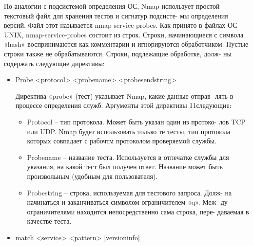 \documentclass[12pt,a4paper]{article}
\begin{document}
По аналогии с подсистемой определения ОС, Nmap использует
простой текстовый файл для хранения тестов и сигнатур подсисте-
мы определения версий. Файл этот называется nmap-service-probes.
Как принято в файлах ОС UNIX, nmap-service-probes состоит из
строк. Строки, начинающиеся с символа «hash» воспринимаются
как комментарии и игнорируются обработчиком. Пустые строки
также не обрабатываются. Строки, подлежащие обработке, долж-
ны содержать следующие директивы:
\begin{itemize}
\item Probe <protocol> <probename> <probesendstring>

Директива «probe» (тест) указывает Nmap, какие данные отправ-
лять в процессе определения служб. Аргументы этой директивы
11следующие:
\begin{itemize}
\item Protocol – тип протокола. Может быть указан один из протоко-
лов TCP или UDP. Nmap будет использовать только те тесты, тип
протокола которых совпадает с рабочтм протоколом проверяемой
службы.
\item Probename – название теста. Используется в отпечатке службы для
указания, на какой тест был получен ответ. Название может быть
произвольным (удобным для пользователя).
\item Probestring – строка, используемая для тестового запроса. Долж-
на начинаться и заканчиваться символом-ограничителем «q». Меж-
ду ограничителями находится непосредственно сама строка, пере-
даваемая в качестве теста.
\end{itemize}
\item match <service> <pattern> [versioninfo]


\end{itemize}
\end{document}
